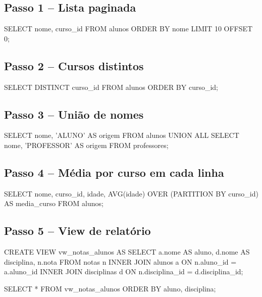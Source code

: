 \subsection*{Passo 1 -- Lista paginada}

\begin{sqlcode}
SELECT nome, curso_id
FROM alunos
ORDER BY nome
LIMIT 10 OFFSET 0;
\end{sqlcode}

\subsection*{Passo 2 -- Cursos distintos}

\begin{sqlcode}
SELECT DISTINCT curso_id
FROM alunos
ORDER BY curso_id;
\end{sqlcode}

\subsection*{Passo 3 -- União de nomes}

\begin{sqlcode}
SELECT nome, 'ALUNO' AS origem
FROM alunos
UNION ALL
SELECT nome, 'PROFESSOR' AS origem
FROM professores;
\end{sqlcode}

\subsection*{Passo 4 -- Média por curso em cada linha}

\begin{sqlcode}
SELECT
    nome,
    curso_id,
    idade,
    AVG(idade) OVER (PARTITION BY curso_id) AS media_curso
FROM alunos;
\end{sqlcode}

\subsection*{Passo 5 -- View de relatório}

\begin{sqlcode}
CREATE VIEW vw_notas_alunos AS
SELECT
    a.nome AS aluno,
    d.nome AS disciplina,
    n.nota
FROM notas n
INNER JOIN alunos a
    ON n.aluno_id = a.aluno_id
INNER JOIN disciplinas d
    ON n.disciplina_id = d.disciplina_id;
\end{sqlcode}

\begin{sqlcode}
SELECT *
FROM vw_notas_alunos
ORDER BY aluno, disciplina;
\end{sqlcode}

